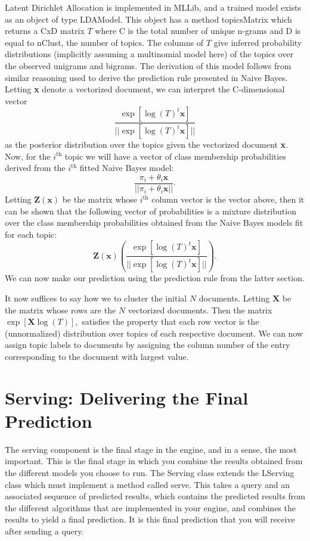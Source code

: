 \documentclass[a4paper,12pt]{article}
\renewcommand{\bf}[1]{\textbf{#1}}
\newcommand{\3}{\left}
\newcommand{\4}{\right}
\renewcommand{\-}[1]{{}^{-#1}}
\begin{document}
Latent Dirichlet Allocation is implemented in MLLib, and a trained model exists as an object of type LDAModel. This object has a method topicsMatrix which returns a CxD matrix $T$ where C is the total number of unique n-grams and D is equal to nClust, the number of topics. The columns of $T$ give inferred probability distributions (implicitly assuming a multinomial model here) of the topics over the observed unigrams and bigrams. The derivation of this model follows from similar reasoning used to derive the prediction rule presented in Naive Bayes. Letting \bf{x} denote a vectorized document, we can interpret the C-dimensional vector 
$$
\frac{\exp\3[\log(T)^t\bf{x}\4]}{||\exp\3[\log(T)^t\bf{x}\4]||}
$$ 
as the posterior distribution over the topics given the vectorized document \bf{x}. Now, for the $i^\text{th}$ topic we will have a vector of class membership probabilities derived from the $i^\text{th}$ fitted Naive Bayes model:
$$
\frac{\pi_i + \theta_i\bf{x}}{||\pi_i + \theta_i\bf{x}||}.
$$
Letting $\bf{Z}(\bf{x})$ be the matrix whose $i^\text{th}$ column vector is the vector above, then it can be shown that the following vector of probabilities is a mixture distribution over the class membership probabilities obtained from the Naive Bayes models fit for each topic:
$$
\bf{Z}(\bf{x})\3(\frac{\exp\3[\log(T)^t\bf{x}\4]}{||\exp\3[\log(T)^t\bf{x}\4]||}\4).
$$
We can now make our prediction using the prediction rule from the latter section.

It now suffices to say how we to cluster the initial $N$ documents. Letting $\bf{X}$ be the matrix whose rows are the $N$ vectorized documents. Then the matrix $\exp\3[\bf{X} \log(T)\4],$ satisfies the property that each row vector is the (unnormalized) distribution over topics of each respective document. We can now assign topic labels to documents by assigning the column number of the entry corresponding to the document with largest value.

\section*{Serving: Delivering the Final Prediction}

The serving component is the final stage in the engine, and in a sense, the most important. This is the final stage in which you combine the results obtained from the different models you choose to run. The Serving class extends the LServing
 class which must implement a method called serve. This takes a query and an associated sequence of predicted results, which contains the predicted results from the different algorithms that are implemented in your engine, and combines the results to yield a final prediction.  It is this final prediction that you will receive after sending a query. 
 
\end{document}
